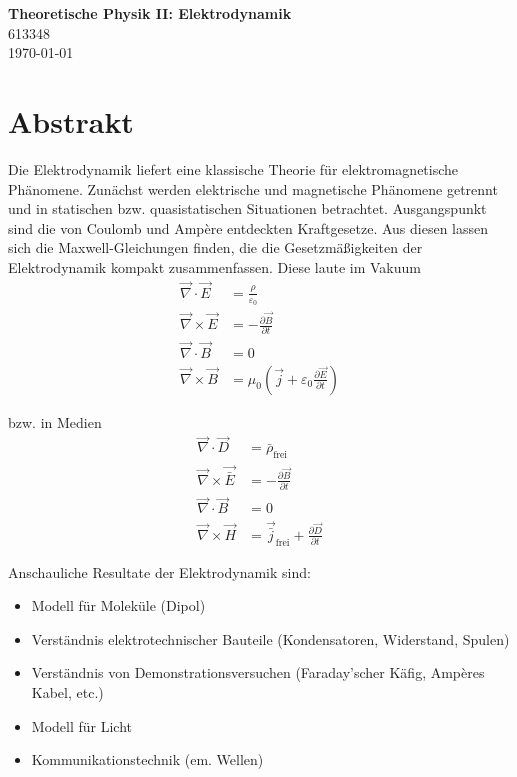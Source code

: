 \documentclass{article}
\newcommand{\lr}[1]{\left(#1\right)}
\begin{document}
\begin{center}
	\Large{\textbf{Theoretische Physik II: Elektrodynamik}}\\
	\small{613348}\\
	\small{\today}
\end{center}

\tableofcontents


\newpage


\section*{Abstrakt}
Die Elektrodynamik liefert eine klassische Theorie für elektromagnetische Phänomene. Zunächst werden elektrische und magnetische Phänomene getrennt und in statischen bzw. quasistatischen Situationen betrachtet. Ausgangspunkt sind die von Coulomb und Ampère entdeckten Kraftgesetze. Aus diesen lassen sich die Maxwell-Gleichungen finden, die die Gesetzmäßigkeiten der Elektrodynamik kompakt zusammenfassen. Diese laute im Vakuum
	\begin{align*}
		\vec{\nabla}\cdot \vec{E} &= \frac{\rho}{\varepsilon_0} \\
		\vec{\nabla} \times \vec{E} &= -\frac{\partial\vec{B}}{\partial t} \\
		\vec{\nabla} \cdot \vec{B} &= 0 \\
		\vec{\nabla} \times \vec{B} &= \mu_0 \lr{ \vec{j} + \varepsilon_0\frac{\partial\vec{E}}{\partial t} }
	\end{align*}

bzw. in Medien
	\begin{align*}
		\vec{\nabla}\cdot \vec{D} &= \bar{\rho}_\text{frei} \\
		\vec{\nabla} \times \vec{\bar{E}} &= -\frac{\partial\vec{B}}{\partial t} \\
		\vec{\nabla} \cdot \vec{B} &= 0 \\
		\vec{\nabla} \times \vec{H} &= \vec{\bar{j}}_\text{frei} + \frac{\partial\vec{D}}{\partial t}
	\end{align*}


Anschauliche Resultate der Elektrodynamik sind:
	\begin{itemize}
		\setlength{\itemsep}{0pt}
		\item Modell für Moleküle (Dipol)
		\item Verständnis elektrotechnischer Bauteile (Kondensatoren, Widerstand, Spulen)
		\item Verständnis von Demonstrationsversuchen (Faraday'scher Käfig, Ampères Kabel, etc.)
		\item Modell für Licht
		\item Kommunikationstechnik (em. Wellen)
	\end{itemize}
\end{document}
